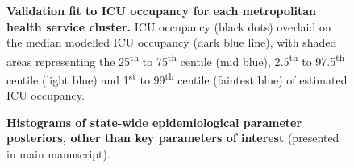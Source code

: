 \begin{figure}[ht]
    \caption{\textbf{Validation fit to ICU occupancy for each metropolitan health service cluster.} ICU occupancy (black dots) overlaid on the median modelled ICU occupancy (dark blue line), with shaded areas representing the 25\textsuperscript{th} to 75\textsuperscript{th} centile (mid blue), 2.5\textsuperscript{th} to 97.5\textsuperscript{th} centile (light blue) and 1\textsuperscript{st} to 99\textsuperscript{th} centile (faintest blue) of estimated ICU occupancy.}
\end{figure}

\begin{figure}[ht]
    \caption{\textbf{Histograms of state-wide epidemiological parameter posteriors, other than key parameters of interest} (presented in main manuscript).}
\end{figure}

